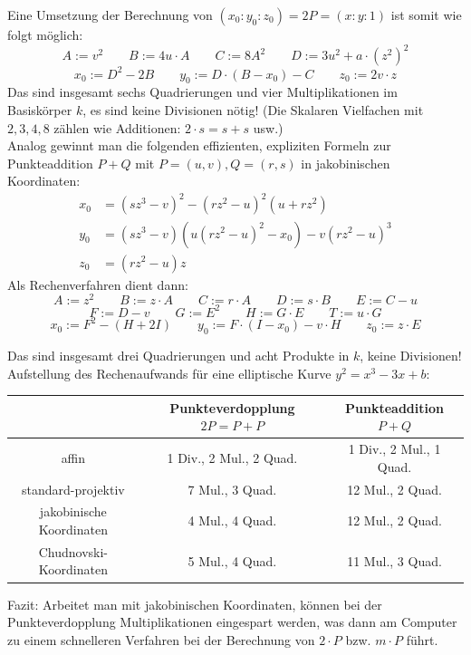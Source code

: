 \begin{bem}
	Eine Umsetzung der Berechnung von $(x_0:y_0:z_0) = 2P = (x:y:1)$ ist somit wie folgt möglich:
	\[
		A := v^2 \qquad B:= 4u \cdot A \qquad C:=8A^2 \qquad D:=3u^2+a\cdot (z^2)^2
	\]
	\[
		x_0 := D^2 - 2B \qquad y_0 := D \cdot(B-x_0) -C \qquad z_0 := 2v \cdot z
	\]
	Das sind insgesamt sechs Quadrierungen und vier Multiplikationen im Basiskörper $k$, es sind keine Divisionen nötig!
	(Die Skalaren Vielfachen mit $2,3,4,8$ zählen wie Additionen: $2 \cdot s = s+s$ usw.) \\
	Analog gewinnt man die folgenden effizienten, expliziten Formeln zur Punkteaddition $P+Q$ mit $P=(u,v), Q=(r,s)$ in jakobinischen Koordinaten:
	\begin{equation}
	\begin{aligned}
		x_0 &= (sz^3 - v)^2 - (rz^2-u)^2(u+rz^2) \\
		y_0 &= (sz^3 - v)(u(rz^2-u)^2-x_0)-v(rz^2-u)^3 \\
		z_0 &= (rz^2-u)z
	\end{aligned}
	\end{equation}
	Als Rechenverfahren dient dann:
	\[
		A:= z^2 \qquad B:= z\cdot A \qquad C:= r \cdot A \qquad D:= s \cdot B \qquad E:= C-u
	\]
	\[
		F:= D-v \qquad G:= E^2 \qquad H:=G \cdot E \qquad T:= u \cdot G
	\]
	\[
		x_0 := F^2 - (H+2I) \qquad y_0 := F \cdot (I-x_0)-v \cdot H \qquad z_0 := z \cdot E
	\]
\end{bem}

\begin{bem}
	Das sind insgesamt drei Quadrierungen und acht Produkte in $k$, keine Divisionen!
	Aufstellung des Rechenaufwands für eine elliptische Kurve $y^2 = x^3 - 3x + b$:
	\begin{center}
		\begin{tabular}{c|c|c}
		& Punkteverdopplung $2P = P+P$ & Punkteaddition $P+Q$ \\ 
		\hline affin & 1 Div., 2 Mul., 2 Quad. & 1 Div., 2 Mul., 1 Quad. \\ 
		standard-projektiv & 7 Mul., 3 Quad. & 12 Mul., 2 Quad. \\ 
		jakobinische Koordinaten & 4 Mul., 4 Quad. & 12 Mul., 2 Quad. \\ 
		Chudnovski-Koordinaten & 5 Mul., 4 Quad. & 11 Mul., 3 Quad. 
		\end{tabular} 
	\end{center}
\end{bem}

\begin{bem}
	Fazit: Arbeitet man mit jakobinischen Koordinaten, können bei der Punkteverdopplung Multiplikationen eingespart werden, was dann am Computer zu einem schnelleren Verfahren bei der Berechnung von $2 \cdot P$ bzw. $m \cdot P$ führt.
\end{bem}

